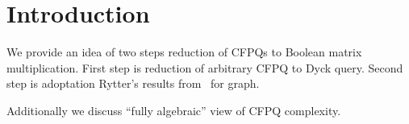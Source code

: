 \section{Introduction}

We provide an idea of two steps reduction of CFPQs to Boolean matrix multiplication.
First step is reduction of arbitrary CFPQ to Dyck query.
Second step is adoptation Rytter's results from~\cite{Rytter} for graph.

Additionally we discuss ``fully algebraic'' view of CFPQ complexity.